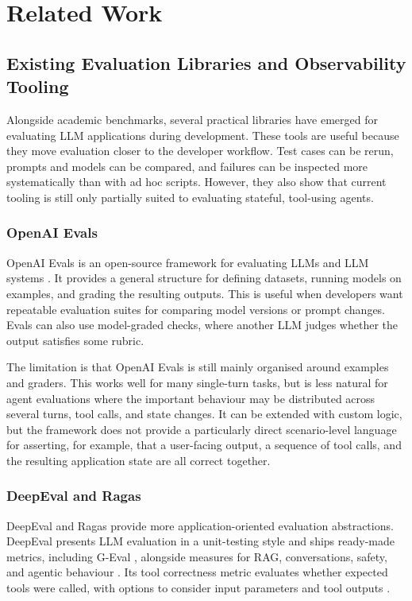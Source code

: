 \chapter{Related Work}
\label{chap:related-work}

\section{Existing Evaluation Libraries and Observability Tooling}
\label{sec:existing_eval_libraries}

Alongside academic benchmarks, several practical libraries have emerged for evaluating LLM applications during development. These tools are useful because they move evaluation closer to the developer workflow. Test cases can be rerun, prompts and models can be compared, and failures can be inspected more systematically than with ad hoc scripts. However, they also show that current tooling is still only partially suited to evaluating stateful, tool-using agents.

\subsection{OpenAI Evals}

OpenAI Evals is an open-source framework for evaluating LLMs and LLM systems \citep{openaiEvals}. It provides a general structure for defining datasets, running models on examples, and grading the resulting outputs. This is useful when developers want repeatable evaluation suites for comparing model versions or prompt changes. Evals can also use model-graded checks, where another LLM judges whether the output satisfies some rubric.

The limitation is that OpenAI Evals is still mainly organised around examples and graders. This works well for many single-turn tasks, but is less natural for agent evaluations where the important behaviour may be distributed across several turns, tool calls, and state changes. It can be extended with custom logic, but the framework does not provide a particularly direct scenario-level language for asserting, for example, that a user-facing output, a sequence of tool calls, and the resulting application state are all correct together.

\subsection{DeepEval and Ragas}

DeepEval and Ragas provide more application-oriented evaluation abstractions. DeepEval presents LLM evaluation in a unit-testing style and ships ready-made metrics, including G-Eval \citep{liu2023geval}, alongside measures for RAG, conversations, safety, and agentic behaviour \citep{deepevalDocs}. Its tool correctness metric evaluates whether expected tools were called, with options to consider input parameters and tool outputs \citep{deepevalDocs}.

